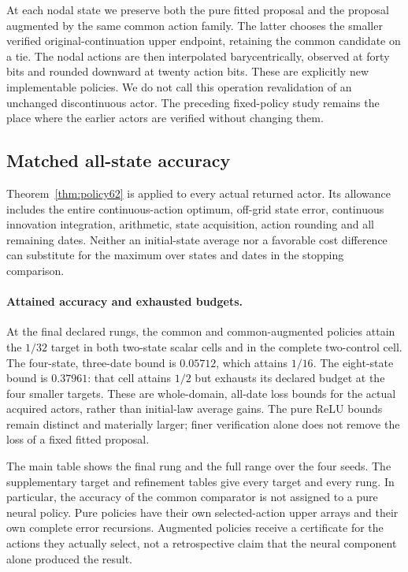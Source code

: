 At each nodal state we preserve both the pure fitted proposal and the proposal augmented by the same common action family. The latter chooses the smaller verified original-continuation upper endpoint, retaining the common candidate on a tie. The nodal actions are then interpolated barycentrically, observed at forty bits and rounded downward at twenty action bits. These are explicitly new implementable policies. We do not call this operation revalidation of an unchanged discontinuous actor. The preceding fixed-policy study remains the place where the earlier actors are verified without changing them.

\subsection{Matched all-state accuracy}
Theorem~\ref{thm:policy62} is applied to every actual returned actor. Its allowance includes the entire continuous-action optimum, off-grid state error, continuous innovation integration, arithmetic, state acquisition, action rounding and all remaining dates. Neither an initial-state average nor a favorable cost difference can substitute for the maximum over states and dates in the stopping comparison.



\paragraph{Attained accuracy and exhausted budgets.}
At the final declared rungs, the common and common-augmented policies attain the $1/32$ target in both two-state scalar cells and in the complete two-control cell. The four-state, three-date bound is $0.05712$, which attains $1/16$. The eight-state bound is $0.37961$: that cell attains $1/2$ but exhausts its declared budget at the four smaller targets. These are whole-domain, all-date loss bounds for the actual acquired actors, rather than initial-law average gains. The pure ReLU bounds remain distinct and materially larger; finer verification alone does not remove the loss of a fixed fitted proposal.


The main table shows the final rung and the full range over the four seeds. The supplementary target and refinement tables give every target and every rung. In particular, the accuracy of the common comparator is not assigned to a pure neural policy. Pure policies have their own selected-action upper arrays and their own complete error recursions. Augmented policies receive a certificate for the actions they actually select, not a retrospective claim that the neural component alone produced the result.


